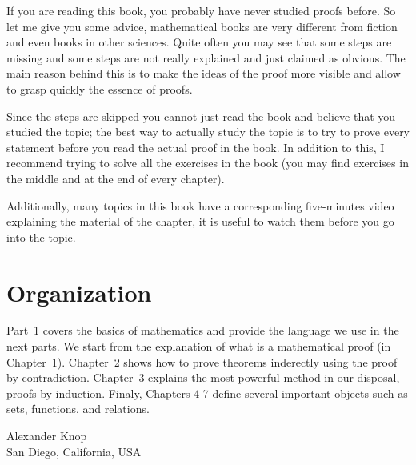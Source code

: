 If you are reading this book, you probably have never studied proofs before. So let me give you some advice, mathematical books are very different from fiction and even books in other sciences. Quite often you may see that some steps are missing and some steps are not really explained and just claimed as obvious.  The main reason behind this is to make the ideas of the proof more visible and allow to grasp quickly the essence of proofs.

Since the steps are skipped you cannot just read the book and believe that you studied the topic;  the best way to actually study the topic is to try to prove every statement before you read the actual proof in the book. In addition to this, I recommend trying to solve all the exercises in the book (you may find exercises in the middle and at the end of every chapter).

Additionally, many topics in this book have a corresponding five-minutes video explaining the material of the chapter, it is useful to watch them before you go into the topic.

\section*{Organization}
Part~1 covers the basics of mathematics and provide the language we use in the
next parts. We start from the explanation of what is a mathematical proof (in Chapter~1). Chapter~2 shows how to prove theorems inderectly using the proof by contradiction. Chapter~3 explains the most powerful method in our disposal, proofs by induction. Finaly, Chapters 4-7 define several important objects such as sets, functions, and relations.

\begin{flushright}
  Alexander Knop \\
  San Diego, California, USA
\end{flushright}
